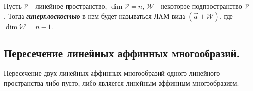 \begin{definition}
    Пусть $\mathcal{V}$ - линейное пространство, $\dim \mathcal{V} = n$, $\mathcal{W}$ - некоторое подпространство $\mathcal{V}$. Тогда \textbf{\textit{гиперплоскостью}} в нем будет называться ЛАМ вида $(\vec{a} + \mathcal{W})$, где $\dim \mathcal{W} = n - 1$.
\end{definition}


\newpage


\subsection{
    Пересечение линейных аффинных многообразий.
}

\begin{theorem}
    Пересечение двух линейных аффинных многообразий одного линейного пространства либо пусто, либо является линейным аффинным многообразием.
\end{theorem}

